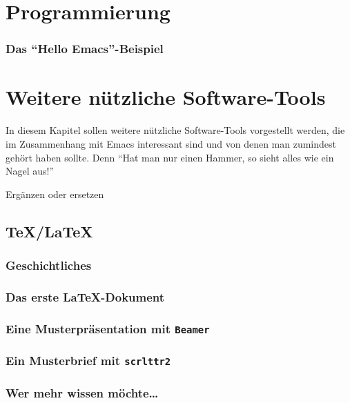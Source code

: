 \documentclass[12pt,ngerman]{scrbook}
\begin{document}
\chapter{Programmierung}

\subsection{Das \enquote{Hello Emacs}-Beispiel}




\chapter{Weitere nützliche Software-Tools}

In diesem Kapitel sollen weitere nützliche Software-Tools vorgestellt werden, die im Zusammenhang mit Emacs interessant sind und von denen man zumindest gehört haben sollte. Denn \enquote{Hat man nur einen Hammer, so sieht alles wie ein Nagel aus!}	

Ergänzen oder ersetzen

\section{\TeX/\LaTeX}

\subsection{Geschichtliches}



\subsection{Das erste \LaTeX-Dokument}


\subsection{Eine Musterpräsentation mit \texttt{Beamer}}


\subsection{Ein Musterbrief mit \texttt{scrlttr2}}


\subsection{Wer mehr wissen möchte\ldots}
\end{document}
